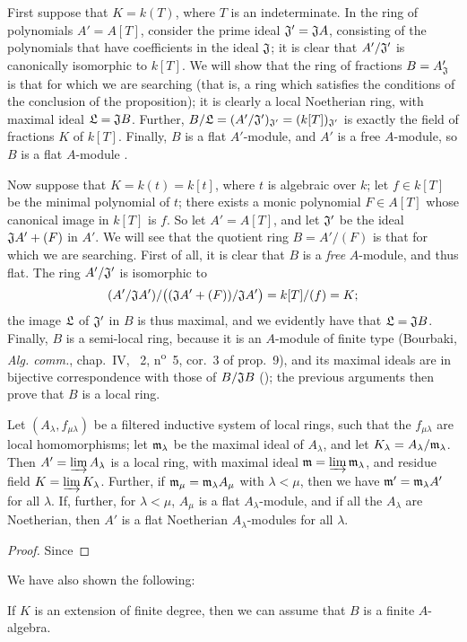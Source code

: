\begin{env}[10.3.1.1]
\label{0.10.3.1.1}
First suppose that $K=k(T)$, where $T$ is an indeterminate.
In the ring of polynomials $A'=A[T]$, consider the prime ideal $\mathfrak{J}'=\mathfrak{J}A$, consisting of the
polynomials that have coefficients in the ideal $\mathfrak{J}$;
it is clear that $A'/\mathfrak{J}'$ is canonically isomorphic to $k[T]$.
We will show that the ring of fractions $B=A'_\mathfrak{J}$ is that for which we are searching (that is, a ring which satisfies the conditions of the conclusion of the proposition);
it is clearly a local Noetherian ring, with maximal ideal $\mathfrak{L}=\mathfrak{J}B$.
Further, $B/\mathfrak{L}=(A'/\mathfrak{J}')_{\mathfrak{J}'}=(k[T])_{\mathfrak{J}'}$ is exactly the field of fractions $K$ of $k[T]$.
Finally, $B$ is a flat $A'$-module, and $A'$ is a free $A$-module, so $B$ is a flat $A$-module .
\end{env}

\begin{env}[10.3.1.2]
\label{0.10.3.1.2}
Now suppose that $K=k(t)=k[t]$, where $t$ is algebraic over $k$;
let $f\in k[T]$ be the minimal polynomial of $t$;
there exists a monic polynomial $F\in A[T]$ whose canonical image in $k[T]$ is $f$.
So let $A'=A[T]$, and let $\mathfrak{J}'$ be the ideal $\mathfrak{J}A'+(F)$ in $A'$.
We will see that the quotient ring $B=A'/(F)$ is that for which we are searching.
First of all, it is clear that $B$ is a \emph{free} $A$-module, and thus flat.
The ring $A'/\mathfrak{J}'$ is isomorphic to
\[
(A'/\mathfrak{J}A') / \big( (\mathfrak{J}A'+(F))/\mathfrak{J}A' \big) = k[T]/(f) = K;
\]
the image $\mathfrak{L}$ of $\mathfrak{J}'$ in $B$ is thus maximal, and we evidently have that $\mathfrak{L}=\mathfrak{J}B$.
Finally, $B$ is a semi-local ring, because it is an $A$-module of finite type (Bourbaki, \emph{Alg. comm.}, chap.~IV, \textsection~2, n\textsuperscript{o}~5, cor.~3 of prop.~9), and its maximal ideals are in bijective correspondence with those of $B/\mathfrak{J}B$ (\cite[vol.~I, p.~259]{I-13});
the previous arguments then prove that $B$ is a local ring.
\end{env}

\begin{lem}[10.3.1.3]
\label{0.10.3.1.3}
Let $(A_\lambda,f_{\mu\lambda})$ be a filtered inductive system of local rings, such that the $f_{\mu\lambda}$ are local homomorphisms;
let $\mathfrak{m}_\lambda$ be the maximal ideal of $A_\lambda$, and let $K_\lambda=A_\lambda/\mathfrak{m}_\lambda$.
Then $A'=\varinjlim A_\lambda$ is a local ring, with maximal ideal $\mathfrak{m}=\varinjlim\mathfrak{m}_\lambda$, and residue field $K=\varinjlim K_\lambda$.
Further, if $\mathfrak{m}_\mu=\mathfrak{m}_\lambda A_\mu$ with $\lambda<\mu$, then we have $\mathfrak{m}'=\mathfrak{m}_\lambda A'$ for all $\lambda$.
If, further, for $\lambda<\mu$, $A_\mu$ is a flat $A_\lambda$-module, and if all the $A_\lambda$ are Noetherian, then $A'$ is a flat Noetherian $A_\lambda$-modules for all $\lambda$.
\end{lem}

\begin{proof}
\label{proof-0.10.3.1.3}
Since
\end{proof}

\begin{env}[10.3.1.4]
\label{0.10.3.1.4}
\end{env}

We have also shown the following:
\begin{cor}[10.3.2]
\label{0.10.3.2}
If $K$ is an extension of finite degree, then we can assume that $B$ is a finite $A$-algebra.
\end{cor}
